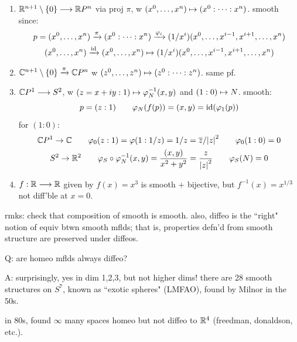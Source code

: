 \begin{xmp}[source=Primary Source Material]
    \vspace{-0.2in}
	\begin{enumerate}[(1)]
		\item $\mathbb{R}^{n+1}\setminus\left\{{0}\right\}\longrightarrow\mathbb{R} P^{n}$ via proj $\pi$, w
			$(x^{0},\dots,x^{n}) \mapsto (x^{0}:\cdots:x^{n})$. smooth since:
			\begin{gather*}
			    p=(x^{0},\dots,x^{n}) \xrightarrow{\pi} (x^{0}:\cdots:x^{n}) \xrightarrow{\varphi_{i}} (1/x^{i})(x^{0},\dots,x^{i-1},x^{i+1},\dots,x^{n}) \\
			    (x^{0},\dots,x^{n}) \xrightarrow{\textrm{id}} (x^{0},\dots,x^{n}) \mapsto (1/x^{i})(x^{0},\dots,x^{i-1},x^{i+1},\dots,x^{n})
			\end{gather*}
		\item $\mathbb{C}^{n+1}\setminus\left\{{0}\right\}\xrightarrow{\pi}\mathbb{C} P^{n}$ w $(z^{0},\dots,z^{n})\mapsto(z^{0}:\cdots:z^{n})$.
			same pf.
		\item $\mathbb{C} P^{1}\longrightarrow S^{2}$, w $(z=x+iy:1)\mapsto\varphi_{N}^{-1}(x,y)$
			and $(1:0)\mapsto N$. smooth:
			\begin{equation*}
				p=(z:1) \qquad \varphi_{N}(f(p)) = (x,y) = \textrm{id}(\varphi_{1}(p))
			\end{equation*}
			for $(1:0)$:
			\begin{gather*}
				\mathbb{C} P^{1}\rightarrow\mathbb{C} \qquad \varphi_{0}(z:1)=\varphi(1:1/z)=1/z=\overline{z}/\abs{z}^{2}
				\qquad \varphi_{0}(1:0)=0 \\
				S^{2}\rightarrow\mathbb{R}^{2} \qquad \varphi_{S}\circ\varphi_{N}^{-1}(x,y)=\frac{(x,y)}{x^{2}+y^{2}}=\frac{z}{\abs{z}^{2}}
				\qquad \varphi_{S}(N)=0
			\end{gather*}
		\item $f:\mathbb{R}\longrightarrow\mathbb{R}$ given by $f(x)=x^{3}$ is smooth + bijective,
			but $f^{-1}(x)=x^{1/3}$ not diff'ble at $x=0$.
	\end{enumerate}
\end{xmp}
rmks: check that composition of smooth is smooth.
also, diffeo is the ``right" notion of equiv btwn smooth mflds; that is,
properties defn'd from smooth structure are preserved under diffeos.

Q: are homeo mflds always diffeo?

A: surprisingly, yes in dim 1,2,3, but not higher dims!
there are 28 smooth structures on $S^{7}$, known as ``exotic spheres" (LMFAO),
found by Milnor in the 50s.

in 80s, found $\infty$ many spaces homeo but not diffeo to $\mathbb{R}^{4}$
(freedman, donaldson, etc.).

